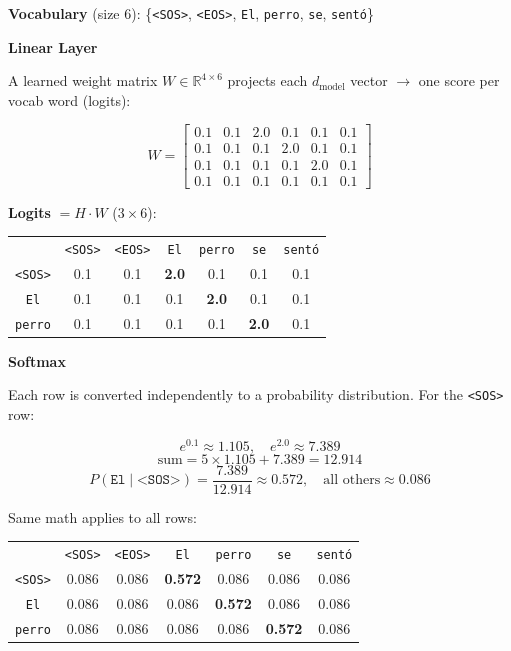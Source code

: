 \noindent\textbf{Vocabulary} (size 6): \{\texttt{<SOS>}, \texttt{<EOS>}, \texttt{El}, \texttt{perro}, \texttt{se}, \texttt{sent\'{o}}\}

\medskip
\noindent\textbf{Linear Layer}

A learned weight matrix $W \in \mathbb{R}^{4 \times 6}$ projects each $d_{\text{model}}$ vector $\to$ one score per vocab word (logits):

\[
W = \begin{bmatrix}
0.1 & 0.1 & \mathbf{2.0} & 0.1 & 0.1 & 0.1 \\
0.1 & 0.1 & 0.1 & \mathbf{2.0} & 0.1 & 0.1 \\
0.1 & 0.1 & 0.1 & 0.1 & \mathbf{2.0} & 0.1 \\
0.1 & 0.1 & 0.1 & 0.1 & 0.1 & 0.1
\end{bmatrix}
\]

\noindent\textbf{Logits} $= H \cdot W$ ($3\times6$):

\begin{center}
\small
\begin{tabular}{c|cccccc}
 & \texttt{<SOS>} & \texttt{<EOS>} & \texttt{El} & \texttt{perro} & \texttt{se} & \texttt{sent\'{o}} \\
\texttt{<SOS>} & 0.1 & 0.1 & \textbf{2.0} & 0.1 & 0.1 & 0.1 \\
\texttt{El}    & 0.1 & 0.1 & 0.1 & \textbf{2.0} & 0.1 & 0.1 \\
\texttt{perro} & 0.1 & 0.1 & 0.1 & 0.1 & \textbf{2.0} & 0.1 \\
\end{tabular}
\end{center}

\medskip
\noindent\textbf{Softmax}

Each row is converted independently to a probability distribution. For the \texttt{<SOS>} row:

\[
e^{0.1} \approx 1.105, \quad e^{2.0} \approx 7.389
\]
\[
\text{sum} = 5 \times 1.105 + 7.389 = 12.914
\]
\[
P(\texttt{El} \mid \texttt{<SOS>}) = \frac{7.389}{12.914} \approx 0.572, \quad \text{all others} \approx 0.086
\]

Same math applies to all rows:

\begin{center}
\small
\begin{tabular}{c|cccccc}
 & \texttt{<SOS>} & \texttt{<EOS>} & \texttt{El} & \texttt{perro} & \texttt{se} & \texttt{sent\'{o}} \\
\texttt{<SOS>} & 0.086 & 0.086 & \textbf{0.572} & 0.086 & 0.086 & 0.086 \\
\texttt{El}    & 0.086 & 0.086 & 0.086 & \textbf{0.572} & 0.086 & 0.086 \\
\texttt{perro} & 0.086 & 0.086 & 0.086 & 0.086 & \textbf{0.572} & 0.086 \\
\end{tabular}
\end{center}

